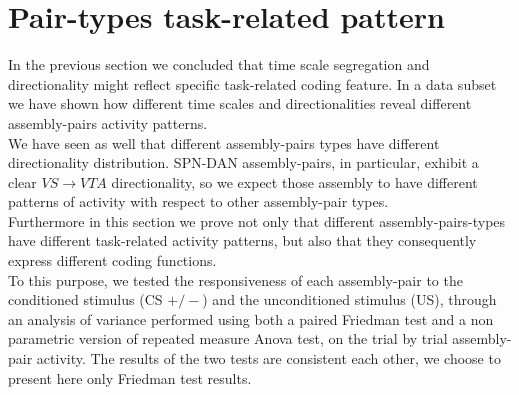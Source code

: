  \section{Pair-types task-related pattern}
 \label{sec:TaskResp}
In the previous section we concluded that time scale segregation and directionality might reflect specific task-related coding feature. In a data subset we have shown how different time scales and directionalities reveal different assembly-pairs activity patterns.\\We have seen as well that different assembly-pairs types have different directionality distribution. SPN-DAN assembly-pairs, in particular, exhibit a clear $VS\rightarrow VTA$ directionality, so we expect those assembly to have different patterns of activity with respect to other assembly-pair types.\\Furthermore in this section we prove not only that different assembly-pairs-types have different task-related activity patterns, but also that they consequently express different coding functions.\\
To this purpose, we tested the responsiveness of each assembly-pair to the conditioned stimulus (CS $+/-$) and the unconditioned stimulus (US), through an analysis of variance performed using both a paired Friedman test and a non parametric version of repeated measure Anova test, on the trial by trial assembly-pair activity. The results of the two tests are consistent each other, we choose to present here only Friedman test results.
